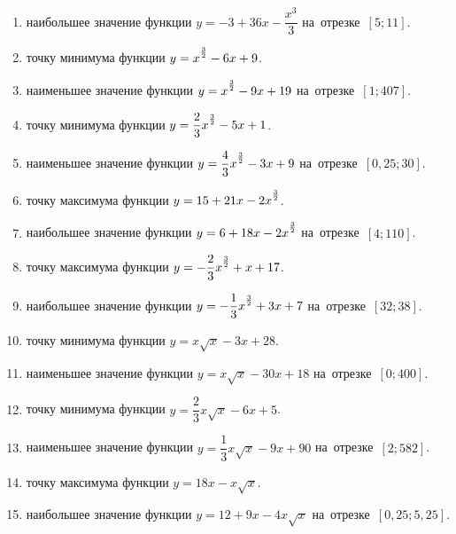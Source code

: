 \documentclass[a4paper,10pt]{article}
\begin{document}
\begin{enumerate}
\item {} наибольшее значение функции $y=-3 +36x-\dfrac{x^3}{3}$ на~отрезке~$\left[5;11\right]$.

\item {} точку минимума функции $y=x\strut^{\frac{3}{2}} -6x+9$.

\item {} наименьшее значение функции $y=x\strut^{\frac{3}{2}} -9x+19$ на~отрезке~$\left[1;407\right]$.

\item {} точку минимума функции $y=\dfrac{2}{3}x\strut^{\frac{3}{2}} -5x+1$.

\item {} наименьшее значение функции $y=\dfrac{4}{3}x\strut^{\frac{3}{2}} -3x+9$ на~отрезке~$\left[0,25;30\right]$.

\item {} точку максимума функции $y=15+21x-2x\strut^{\frac{3}{2}}$.

\item {} наибольшее значение функции $y=6+18x-2x\strut^{\frac{3}{2}}$ на~отрезке~$\left[4;110\right]$.

\item {} точку максимума функции $y=-\dfrac{2}{3}x\strut^{\frac{3}{2}} +x+17$.

\item {} наибольшее значение функции $y=-\dfrac{1}{3}x\strut^{\frac{3}{2}} +3x+7$ на~отрезке~$\left[32;38\right]$.

\item {} точку минимума функции $y=x\sqrt{x} -3x+28$.

\item {} наименьшее значение функции $y=x\sqrt{x} -30x+18$ на~отрезке~$\left[0;400\right]$.

\item {} точку минимума функции $y=\dfrac{2}{3}x\sqrt{x} -6x+5$.

\item {} наименьшее значение функции $y=\dfrac{1}{3}x\sqrt{x} -9x+90$ на~отрезке~$\left[2;582\right]$.

\item {} точку максимума функции $y=18x -x\sqrt{x}$.

\item {} наибольшее значение функции $y=12+9x -4x\sqrt{x}$ на~отрезке~$\left[0,25;5,25\right]$.


\end{enumerate}
\end{document}

